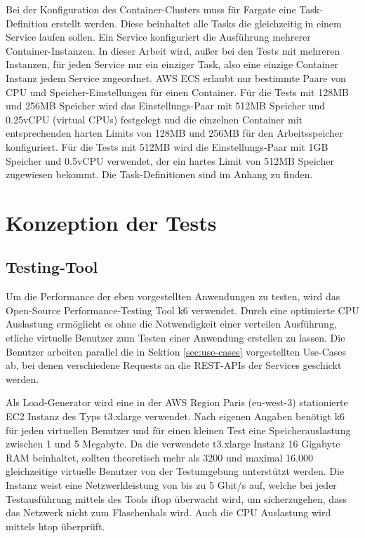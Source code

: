 Bei der Konfiguration des Container-Clusters muss für Fargate eine Task-Definition erstellt werden. Diese beinhaltet alle Tasks die gleichzeitig in einem Service laufen sollen. Ein Service konfiguriert die Ausführung mehrerer Container-Instanzen. In dieser Arbeit wird, außer bei den Tests mit mehreren Instanzen, für jeden Service nur ein einziger Task, also eine einzige Container Instanz jedem Service zugeordnet. AWS ECS erlaubt nur bestimmte Paare von CPU und Speicher-Einstellungen für einen Container. Für die Tests mit 128MB und 256MB Speicher wird das Einstellungs-Paar mit 512MB Speicher und 0.25vCPU (virtual CPUs) festgelegt und die einzelnen Container mit entsprechenden harten Limits von 128MB und 256MB für den Arbeitsspeicher konfiguriert. Für die Tests mit 512MB wird die Einstellungs-Paar mit 1GB Speicher und 0.5vCPU verwendet, der ein hartes Limit von 512MB Speicher zugewiesen bekommt. Die Task-Definitionen sind im Anhang zu finden.

\section{Konzeption der Tests}

\subsection{Testing-Tool}
Um die Performance der eben vorgestellten Anwendungen zu testen, wird das Open-Source Performance-Testing Tool k6 \cite{noauthor_load_nodate} verwendet. Durch eine optimierte CPU Auslastung ermöglicht es ohne die Notwendigkeit einer verteilen Ausführung, etliche virtuelle Benutzer zum Testen einer Anwendung erstellen zu lassen\cite{noauthor_running_nodate}. Die Benutzer arbeiten parallel die in Sektion \ref{sec:use-cases} vorgestellten Use-Cases ab, bei denen verschiedene Requests an die REST-APIs der Services geschickt werden. 

Als Load-Generator wird eine in der AWS Region Paris (eu-west-3) stationierte EC2 Instanz des Typs t3.xlarge verwendet.
Nach eigenen Angaben benötigt k6 für jeden virtuellen Benutzer und für einen kleinen Test eine Speicherauslastung zwischen 1 und 5 Megabyte\cite{noauthor_running_nodate}. Da die verwendete t3.xlarge Instanz 16 Gigabyte RAM beinhaltet, sollten theoretisch mehr als 3200 und maximal 16.000 gleichzeitige virtuelle Benutzer von der Testumgebung unterstützt werden. Die Instanz weist eine Netzwerkleistung von bis zu 5 Gbit/s auf, welche bei jeder Testausführung mittels des Tools iftop überwacht wird, um sicherzugehen, dass das Netzwerk nicht zum Flaschenhals wird. Auch die CPU Auslastung wird mittels htop überprüft.

